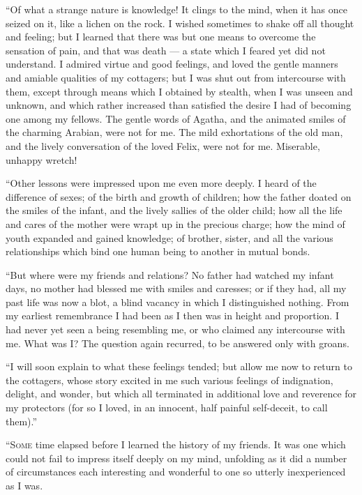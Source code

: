 ``Of what a strange nature is knowledge!
It clings to the mind, when it
has once seized on it, like a lichen on
the rock. I wished sometimes to shake
off all thought and feeling; but I learned
that there was but one means to overcome
the sensation of pain, and that
was death --- a state which I feared yet
did not understand. I admired virtue
and good feelings, and loved the gentle
manners and amiable qualities of my
cottagers; but I was shut out from intercourse
with them, except through
means which I obtained by stealth, when
I was unseen and unknown, and which
rather increased than satisfied the desire
I had of becoming one among my fellows.
The gentle words of Agatha,
and the animated smiles of the charming
Arabian, were not for me. The
mild exhortations of the old man, and
the lively conversation of the loved
Felix, were not for me. Miserable, unhappy
wretch!

``Other lessons were impressed upon
me even more deeply. I heard of the
difference of sexes; of the birth and
growth of children; how the father
doated on the smiles of the infant, and
the lively sallies of the older child;
how all the life and cares of the mother
were wrapt up in the precious charge;
how the mind of youth expanded and
gained knowledge; of brother, sister,
and all the various relationships which
bind one human being to another in
mutual bonds.

``But where were my friends and relations?
No father had watched my
infant days, no mother had blessed me
with smiles and caresses; or if they had,
all my past life was now a blot, a blind
vacancy in which I distinguished nothing.
From my earliest remembrance
I had been as I then was in height and
proportion. I had never yet seen a
being resembling me, or who claimed
any intercourse with me. What was I?
The question again recurred, to be answered
only with groans.

``I will soon explain to what these
feelings tended; but allow me now to
return to the cottagers, whose story excited
in me such various feelings of indignation,
delight, and wonder, but
which all terminated in additional love
and reverence for my protectors (for so
I loved, in an innocent, half painful
self-deceit, to call them).''


``\textsc{Some} time elapsed before I learned
the history of my friends. It was one
which could not fail to impress itself
deeply on my mind, unfolding as it did
a number of circumstances each interesting
and wonderful to one so utterly
inexperienced as I was.

